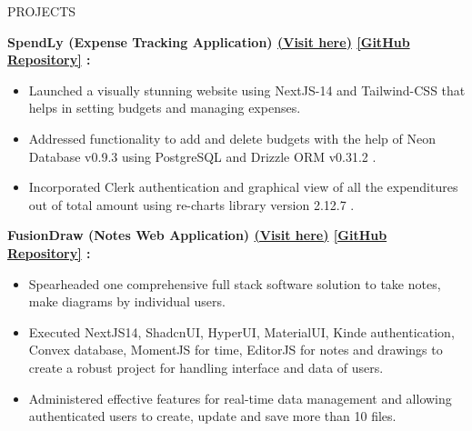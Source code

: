 \documentclass{resume} %
\begin{document}
\begin{rSection}{PROJECTS}
   \vspace{-1.00em}

     \item \textbf{SpendLy (Expense Tracking Application) 
    {\href{https://spendly-beige.vercel.app/}{(Visit here)}}
    {\href{https://github.com/arkapg211002/Spendly}{[GitHub Repository]}} :} 
    \vspace{-0.6em}
    \begin{itemize}
    \setlength\itemsep{-0.6em}
    \item Launched a visually stunning website using NextJS-14 and Tailwind-CSS that helps in setting budgets and managing expenses.
    \item Addressed functionality to add and delete budgets with the help of Neon Database v0.9.3 using PostgreSQL and Drizzle ORM v0.31.2 .
    \item Incorporated Clerk authentication and graphical view of all the expenditures out of total amount using re-charts library version 2.12.7 .
    \end{itemize}
    
    \item \textbf{FusionDraw (Notes Web Application)
    {\href{https://fusion-draw.vercel.app/}{(Visit here)}}
    {\href{https://github.com/arkapg211002/FusionDraw}{[GitHub Repository]}} :}
    \vspace{-0.6em}
    \begin{itemize}
    \setlength\itemsep{-0.6em}
     \item Spearheaded one comprehensive full stack software solution to take notes, make diagrams by individual users.
    \item Executed NextJS14, ShadcnUI, HyperUI, MaterialUI, Kinde authentication, Convex database, MomentJS for time, EditorJS for notes and drawings to create a robust project for handling interface and data of users.
    \item Administered effective features for real-time data management and allowing authenticated users to create, update and save more than 10 files. 
    \end{itemize}
    

\end{rSection}
\end{document}
